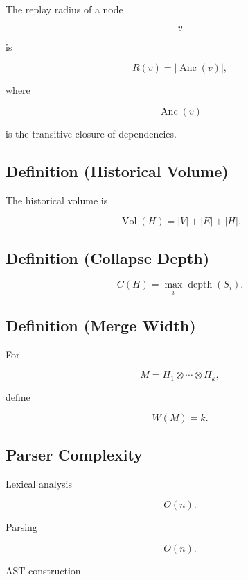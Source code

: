 \documentclass[12pt,oneside]{article}
\theoremstyle{definition}
\theoremstyle{remark}
\begin{document}
The replay radius of a node

\[
v
\]

is

\[
R(v)
=
|\operatorname{Anc}(v)|,
\]

where

\[
\operatorname{Anc}(v)
\]

is the transitive closure of dependencies.

\subsection*{Definition (Historical Volume)}

The historical volume is

\[
\operatorname{Vol}(H)
=
|V|
+
|E|
+
|H|.
\]

\subsection*{Definition (Collapse Depth)}

\[
C(H)
=
\max_i
\operatorname{depth}(S_i).
\]

\subsection*{Definition (Merge Width)}

For

\[
M
=
H_1
\otimes
\cdots
\otimes
H_k,
\]

define

\[
W(M)
=
k.
\]

\subsection*{Parser Complexity}

Lexical analysis

\[
O(n).
\]

Parsing

\[
O(n).
\]

AST construction
\end{document}

